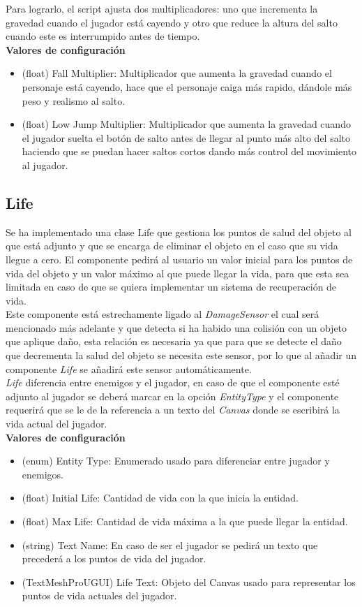 Para lograrlo, el script ajusta dos multiplicadores: uno que incrementa la gravedad cuando el jugador está cayendo y otro que reduce la altura del salto cuando este es interrumpido antes de tiempo.\\

\textbf{Valores de configuración}
\begin{itemize}
	\item (float) Fall Multiplier: Multiplicador que aumenta la gravedad cuando el personaje está cayendo, hace que el personaje caiga más rapido, dándole más peso y realismo al salto.
	\item (float) Low Jump Multiplier: Multiplicador que aumenta la gravedad cuando el jugador suelta el botón de salto antes de llegar al punto más alto del salto haciendo que se puedan hacer saltos cortos dando más control del movimiento al jugador.
\end{itemize}
\subsection{Life}

Se ha implementado una clase Life que gestiona los puntos de salud del objeto al que está adjunto y que se encarga de eliminar el objeto en el caso que su vida llegue a cero. El componente pedirá al usuario un valor inicial para los puntos de vida del objeto y un valor máximo al que puede llegar la vida, para que esta sea limitada en caso de que se quiera implementar un sistema de recuperación de vida.\\

Este componente está estrechamente ligado al \textit{DamageSensor} el cual será mencionado más adelante y que detecta si ha habido una colisión con un objeto que aplique daño, esta relación es necesaria ya que para que se detecte el daño que decrementa la salud del objeto se necesita este sensor, por lo que al añadir un componente \textit{Life} se añadirá este sensor automáticamente.\\

\textit{Life} diferencia entre enemigos y el jugador, en caso de que el componente esté adjunto al jugador se deberá marcar en la opción \textit{EntityType} y el componente requerirá que se le de la referencia a un texto del \textit{Canvas} donde se escribirá la vida actual del jugador.\\

\textbf{Valores de configuración}
\begin{itemize}
	\item (enum) Entity Type: Enumerado usado para diferenciar entre jugador y enemigos.
	\item (float) Initial Life: Cantidad de vida con la que inicia la entidad.
	\item (float) Max Life: Cantidad de vida máxima a la que puede llegar la entidad.
	\item (string) Text Name: En caso de ser el jugador se pedirá un texto que precederá a los puntos de vida del jugador.
	\item (TextMeshProUGUI) Life Text: Objeto del Canvas usado para representar los puntos de vida actuales del jugador.
\end{itemize}

